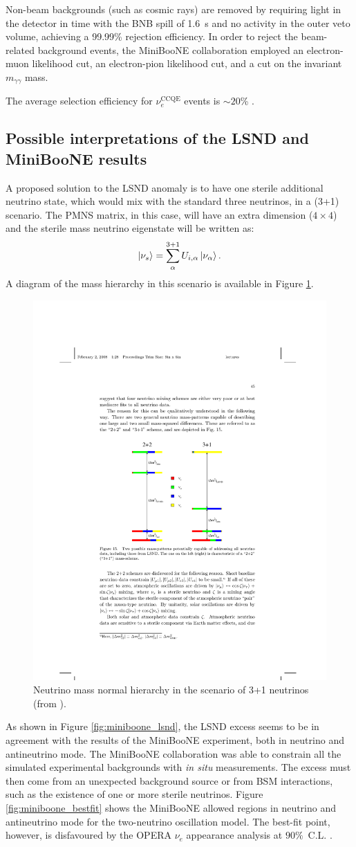 Non-beam backgrounds (such as cosmic rays) are removed by requiring light in the detector in time with the BNB spill of 1.6~\si{\micro}s and no activity in the outer veto volume, achieving a 99.99\% rejection efficiency. 
In order to reject the beam-related background events, the MiniBooNE collaboration employed an electron-muon likelihood cut, an electron-pion likelihood cut, and a cut on the invariant $m_{\gamma\gamma}$ mass.

The average selection efficiency for $\nu_e^{\mathrm{CCQE}}$ events is $\sim20$\% \cite{Aguilar-Arevalo:2018gpe}.

\subsection*{Possible interpretations of the LSND and MiniBooNE results}

A proposed solution to the LSND anomaly is to have one sterile additional neutrino state, which would mix with the standard three neutrinos, in a (3+1) scenario. The PMNS matrix, in this case, will have an extra dimension ($4\times4$) and the sterile mass neutrino eigenstate will be written as:
\begin{equation}
    \ket{\nu_s}=\sum^{3+1}_{\alpha}U_{i,\alpha}\ket{\nu_{\alpha}}.
\end{equation}
A diagram of the mass hierarchy in this scenario is available in Figure \ref{fig:masslsnd}.

\begin{figure}[htbp]
    \centering
    \includegraphics[width=0.3\linewidth]{figures/masslsnd.pdf}
    \caption{Neutrino mass normal hierarchy in the scenario of 3+1 neutrinos (from \cite{deGouvea:2004gd}).}
    \label{fig:masslsnd}
\end{figure}

As shown in Figure \ref{fig:miniboone_lsnd}, the LSND excess seems to be in agreement with the results of the MiniBooNE experiment, both in neutrino and antineutrino mode. The MiniBooNE collaboration was able to constrain all the simulated experimental backgrounds with \emph{in situ} measurements. The excess must then come from an unexpected background source or from BSM interactions, such as the existence of one or more sterile neutrinos.
Figure \ref{fig:miniboone_bestfit} shows the MiniBooNE allowed regions in neutrino and antineutrino mode for the two-neutrino oscillation model. The best-fit point, however, is disfavoured by the OPERA $\nu_{e}$ appearance analysis at $90\%$~C.L. \cite{Agafonova:2018dkb}.

